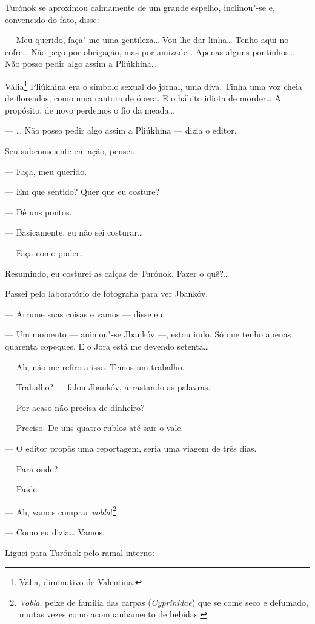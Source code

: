 Turónok se aproximou calmamente de um grande espelho, inclinou"-se e,
convencido do fato, disse:

--- Meu querido, faça"-me uma gentileza\ldots{} Vou lhe dar linha\ldots{}
Tenho aqui no cofre\ldots{} Não peço por obrigação, mas por amizade\ldots{} Apenas
alguns pontinhos\ldots{} Não posso pedir algo assim a Pliúkhina\ldots{}

Vália\footnote{Vália, diminutivo de Valentina.} Pliúkhina era o símbolo sexual do jornal, uma diva. Tinha uma voz cheia de floreados, como uma cantora de ópera. E o hábito idiota de
morder\ldots{} A propósito, de novo perdemos o fio da meada\ldots{}

--- \ldots{} Não posso pedir algo assim a Pliúkhina --- dizia o
editor.

Seu subconsciente em ação, pensei.

--- Faça, meu querido.

--- Em que sentido? Quer que eu costure?

--- Dê uns pontos.

--- Basicamente, eu não sei costurar\ldots{}

--- Faça como puder\ldots{}

Resumindo, eu costurei as calças de Turónok. Fazer o quê?\ldots{}

Passei pelo laboratório de fotografia para ver Jbankóv.

--- Arrume suas coisas e vamos --- disse eu.

--- Um momento --- animou"-se Jbankóv ---, estou
indo. Só que tenho apenas quarenta copeques. E o Jora está me devendo
setenta\ldots{}

--- Ah, não me refiro a isso. Temos um trabalho.

--- Trabalho? --- falou Jbankóv, arrastando as palavras.

--- Por acaso não precisa de dinheiro?

--- Preciso. De uns quatro rublos até sair o vale.

--- O editor propôs uma reportagem, seria uma viagem de três
dias.

--- Para onde?

--- Paide.

--- Ah, vamos comprar \emph{vobla}!\footnote{\emph{Vobla}, peixe
  de família das carpas (\emph{Cyprinidae}) que se come seco e defumado,
  muitas vezes como acompanhamento de bebidas.}

--- Como eu dizia\ldots{} Vamos.

Liguei para Turónok pelo ramal interno:

